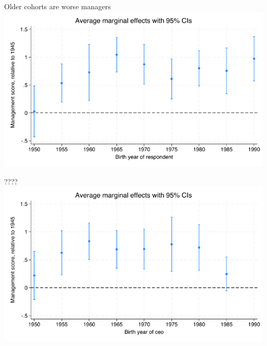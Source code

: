 \documentclass[
  ignorenonframetext,
  aspectratio=1610,
]{beamer}
\begin{document}
\begin{frame}{Older cohorts are worse managers}
\protect\hypertarget{older-cohorts-are-worse-managers}{}
\includegraphics{fig/cohort-respondent-marginsplot.png}
\end{frame}

\begin{frame}{????}
\protect\hypertarget{section}{}
\includegraphics{fig/cohort-ceo-marginsplot.png}
\end{frame}
\end{document}

